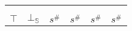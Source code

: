 \documentclass[aspectratio=169]{beamer}
\begin{document}
\begin{frame}
\begin{table}
\begin{tabular}{|l|l|ll|ll|ll|l|}
                                        &                         & \multicolumn{2}{l|}{}                        & \multicolumn{2}{l|}{}                        & \multicolumn{2}{l|}{}                        &                         \\
                                        &                         & \multicolumn{2}{l|}{}                        & \multicolumn{2}{l|}{}                        & \multicolumn{2}{l|}{}                        &                         \\ \hline
        $\top$                          & $\bot_\mathbb{S}$                  & \multicolumn{2}{l|}{$s^\#$}                  & \multicolumn{2}{l|}{$s^\#$}                  & \multicolumn{2}{l|}{$s^\#$}                  & $s^\#$                  \\ \hline
        \end{tabular}
        \end{table}
    \end{frame}
    
    
    
\end{document}
